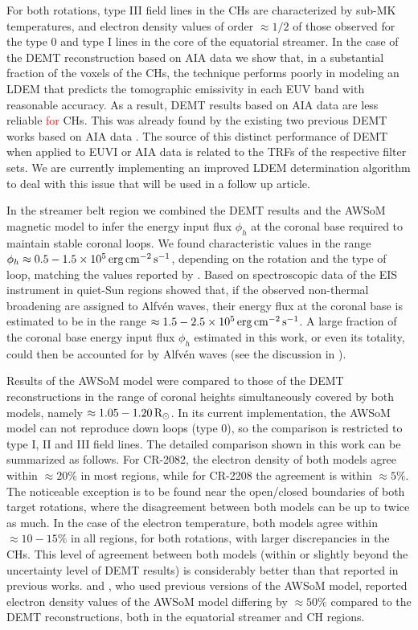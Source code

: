 \documentclass[namedreferences]{solarphysics}
\def\edit#1{\textcolor{Red}{#1}}
\newcommand{\mrsun}{{\rm R_\odot}}
\newcommand{\cm}{{\rm cm}}
\newcommand{\cminvs}{\cm^{-2}}
\newcommand{\erg}{{\rm erg}}
\newcommand{\s}{{\rm s}}
\begin{document}
\begin{article}
{{For both rotations}, type III field lines in the CHs are characterized by sub-MK temperatures, and electron density values of order $\approx 1/2$ of those observed for the type 0 and type I lines in the core of the equatorial streamer. In the case of the {DEMT reconstruction based on AIA data we show that, in} a substantial fraction of the {voxels of the CHs,} the technique performs poorly in modeling {an LDEM that predicts} the tomographic emissivity in each EUV band with reasonable accuracy. As a result, DEMT results based on AIA data {are less reliable \edit{for} CHs}. This was already found by the existing two previous DEMT works based on AIA data \citep{nuevo_2015,maccormack_2017}. The source of this distinct performance of DEMT when applied to EUVI or AIA data is related to the TRFs of the respective filter sets. We are currently implementing an improved LDEM determination algorithm to deal with this issue that will be used in a follow up article.}

{In the streamer belt region we combined the DEMT results and the AWSoM magnetic model to infer the energy input flux $\phi_h$ at the coronal base required to maintain stable coronal loops. We found characteristic values in the range $\phi_h\approx 0.5-1.5 \times 10^5\,\erg\,\cminvs\,\s^{-1}$, depending on the rotation and the type of {loop, matching the values reported by} \citet{maccormack_2017}. Based on spectroscopic data of the EIS instrument in quiet-Sun regions \citet{hahn_2014} showed that, if the observed non-thermal broadening are assigned to Alfvén waves, their energy flux at the coronal base is estimated to be in the range $\approx 1.5-2.5\times 10^5\,\erg\,\cminvs\,\s^{-1}$. A large fraction of the coronal base energy input flux $\phi_h$ estimated in this work, or even its totality, could then be accounted for by Alfvén waves (see the discussion in \citealt{maccormack_2017}).}

Results of the AWSoM model {were compared} to those of the DEMT reconstructions {in the range of coronal heights simultaneously covered by both models, namely $\approx 1.05-1.20\,\mrsun$.} In its current implementation, the AWSoM model can not reproduce down loops (type 0), so the comparison is restricted to type I, II and III field lines. The detailed comparison shown in this work can be summarized as follows. For CR-2082, the electron density of both models agree within $\approx 20\%$ {in most regions}, while for CR-2208 the agreement is within $\approx 5\%$. {The noticeable exception is to be found near the open/closed boundaries of both target rotations, where the disagreement between both models can be up to twice as much.} In the case of the electron temperature, both models agree within $\approx 10-15\%$ in all regions, for both rotations{, with larger discrepancies in the CHs.} This level of agreement between both models {(within or slightly beyond the uncertainty level of DEMT results)} is considerably better than that reported in previous works. \citet{jin_2012} and \citet{oran_2015}{, who used previous versions of the AWSoM model,} reported electron density values of the AWSoM model {differing by $\approx 50\%$ compared to the DEMT reconstructions, both in the equatorial streamer and CH regions.} 


\end{article}
\end{document}
